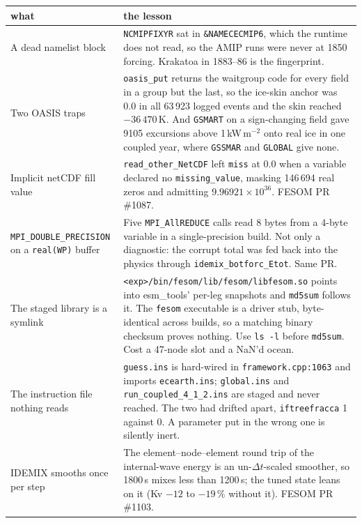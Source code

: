 \documentclass[10pt]{article}
\begin{document}
\begin{center}\small
\begin{tabular}{p{4.2cm}p{11.8cm}}
\toprule
what & the lesson \\
\midrule
A dead namelist block &
\texttt{NCMIPFIXYR} sat in \texttt{\&NAMECECMIP6}, which the runtime does not read, so the
AMIP runs were never at 1850 forcing. Krakatoa in 1883--86 is the fingerprint. \\
\addlinespace
Two OASIS traps &
\texttt{oasis\_put} returns the waitgroup code for every field in a group but the last, so
the ice-skin anchor was 0.0 in all 63\,923 logged events and the skin reached
$-36\,470$\,K. And \texttt{GSMART} on a sign-changing field gave 9105 excursions above
1\,kW\,m$^{-2}$ onto real ice in one coupled year, where \texttt{GSSMAR} and
\texttt{GLOBAL} give none. \\
\addlinespace
Implicit netCDF fill value &
\texttt{read\_other\_NetCDF} left \texttt{miss} at 0.0 when a variable declared no
\texttt{missing\_value}, masking 146\,694 real zeros and admitting
$9.96921\times10^{36}$. FESOM PR \#1087. \\
\addlinespace
\texttt{MPI\_DOUBLE\_PRECISION} on a \texttt{real(WP)} buffer &
Five \texttt{MPI\_AllREDUCE} calls read 8 bytes from a 4-byte variable in a
single-precision build. Not only a diagnostic: the corrupt total was fed back into the
physics through \texttt{idemix\_botforc\_Etot}. Same PR. \\
\addlinespace
The staged library is a symlink &
\texttt{<exp>/bin/fesom/lib/fesom/libfesom.so} points into esm\_tools' per-leg snapshots
and \texttt{md5sum} follows it. The \texttt{fesom} executable is a driver stub,
byte-identical across builds, so a matching binary checksum proves nothing. Use
\texttt{ls -l} before \texttt{md5sum}. Cost a 47-node slot and a NaN'd ocean. \\
\addlinespace
The instruction file nothing reads &
\texttt{guess.ins} is hard-wired in \texttt{framework.cpp:1063} and imports
\texttt{ecearth.ins}; \texttt{global.ins} and \texttt{run\_coupled\_4\_1\_2.ins} are staged
and never reached. The two had drifted apart, \texttt{iftreefracca} 1 against 0. A
parameter put in the wrong one is silently inert. \\
\addlinespace
IDEMIX smooths once per step &
The element--node--element round trip of the internal-wave energy is an un-$\Delta t$-scaled
smoother, so 1800\,s mixes less than 1200\,s; the tuned state leans on it (Kv $-12$ to $-19\,\%$
without it). FESOM PR \#1103. \\

\end{tabular}
\end{center}
\end{document}
